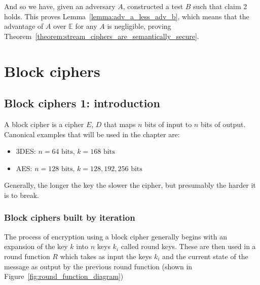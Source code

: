 \documentclass[10pt,a4paper]{report}
\begin{document}
And so we have, given an adversary $A$, constructed a test $B$ such that claim 2 holds. This
proves Lemma~\ref{lemma:adv_a_less_adv_b}, which means that the advantage of $A$ over $\mathbb{E}$
for any $A$ is negligible, proving Theorem~\ref{theorem:stream_ciphers_are_semantically_secure}.

\chapter{Block ciphers}

\section{Block ciphers 1: introduction}

A block cipher is a cipher $E$, $D$ that maps $n$ bits of input to $n$ bits of output. Canonical
examples that will be used in the chapter are:

\begin{itemize}
    \item 3DES: $n = 64\text{ bits}$, $k = 168\text{ bits}$
    \item AES: $n = 128\text{ bits}$, $k = 128, 192, 256\text{ bits}$
\end{itemize}

Generally, the longer the key the slower the cipher, but presumably the harder it is to break.

\subsection{Block ciphers built by iteration}

The process of encryption using a block cipher generally begins with an expansion of the key $k$
into $n$ keys $k_i$ called round keys. These are then used in a round function $R$ which takes as
input the keys $k_i$ and the current state of the message as output by the previous round function
(shown in Figure~\ref{fig:round_function_diagram})
\end{document}
